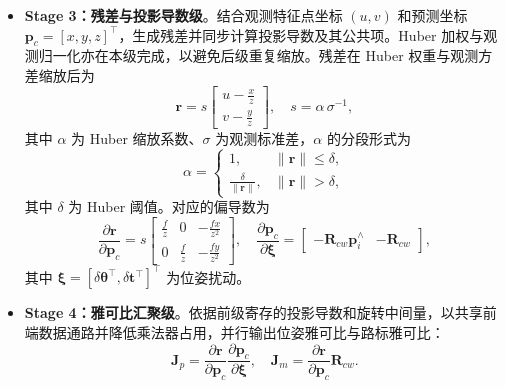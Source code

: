 \begin{itemize}
\begin{equation}
    \end{equation}
    由于同一状态下左右目共享 $\mathbf{p}_i$，本级通过切换外参常量实现双目分支复用。
    \item \textbf{Stage 3：残差与投影导数级}。结合观测特征点坐标 $(u, v)$ 和预测坐标 $\mathbf{p}_c=[x,y,z]^\top$，生成残差并同步计算投影导数及其公共项。Huber 加权与观测归一化亦在本级完成，以避免后级重复缩放。残差在 Huber 权重与观测方差缩放后为
    \begin{equation}
        \mathbf{r} = s\begin{bmatrix} u-\frac{x}{z} \\ v-\frac{y}{z} \end{bmatrix},\quad s=\alpha\,\sigma^{-1},
    \end{equation}
    其中 $\alpha$ 为 Huber 缩放系数、$\sigma$ 为观测标准差，$\alpha$ 的分段形式为
    \begin{equation}
        \alpha=\begin{cases}
            1, & \lVert \mathbf{r} \rVert \leq \delta, \\
            \frac{\delta}{\lVert \mathbf{r} \rVert}, & \lVert \mathbf{r} \rVert > \delta,
        \end{cases}
    \end{equation}
    其中 $\delta$ 为 Huber 阈值。对应的偏导数为
    \begin{equation}
        \frac{\partial \mathbf{r}}{\partial \mathbf{p}_c}=s
        \begin{bmatrix}
            \frac{f}{z} & 0 & -\frac{f x}{z^2} \\
            0 & \frac{f}{z} & -\frac{f y}{z^2}
        \end{bmatrix},\quad
        \frac{\partial \mathbf{p}_c}{\partial \boldsymbol{\xi}}=
        \begin{bmatrix}
            -\mathbf{R}_{cw}\mathbf{p}_i^{\wedge} & -\mathbf{R}_{cw}
        \end{bmatrix},
    \end{equation}
    其中 $\boldsymbol{\xi}=[\delta\boldsymbol{\theta}^\top,\delta\mathbf{t}^\top]^\top$ 为位姿扰动。
    \item \textbf{Stage 4：雅可比汇聚级}。依据前级寄存的投影导数和旋转中间量，以共享前端数据通路并降低乘法器占用，并行输出位姿雅可比与路标雅可比：
    \begin{equation}
        \mathbf{J}_p=\frac{\partial \mathbf{r}}{\partial \mathbf{p}_c}\frac{\partial \mathbf{p}_c}{\partial \boldsymbol{\xi}},\quad
        \mathbf{J}_m=\frac{\partial \mathbf{r}}{\partial \mathbf{p}_c}\mathbf{R}_{cw}.

\end{equation}
\end{itemize}
